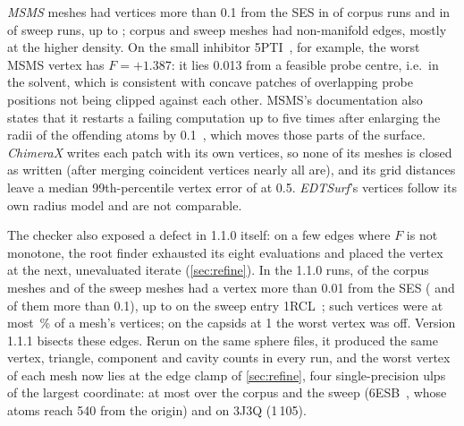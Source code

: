 \emph{MSMS} meshes had vertices more than 0.1\Ang{} from the SES in
 of  corpus runs and in
 of  sweep runs, up to
\Ang;  corpus and
 sweep meshes had non-manifold edges, mostly at the
higher density. On the small inhibitor 5PTI~\cite{pdb5pti}, for example, the worst MSMS
vertex has $F = +1.387$\Ang: it lies 0.013\Ang{} from a feasible probe
centre, i.e.\ in the solvent, which is consistent with concave patches of
overlapping probe positions not being clipped against each other. MSMS's
documentation also states that it restarts a failing computation up to five
times after enlarging the radii of the offending atoms by
0.1\Ang~\cite{msmsmanual}, which moves those parts of the surface.
\emph{ChimeraX} writes each patch with its own vertices, so none of its
meshes is closed as written (after merging coincident vertices nearly all
are), and its grid distances leave a median 99th-percentile vertex error of
\Ang{} at 0.5\Ang. \emph{EDTSurf}'s vertices follow its
own radius model and are not comparable.

The checker also exposed a defect in \sesmesh{} 1.1.0 itself: on a few edges
where $F$ is not monotone, the root finder exhausted its eight evaluations
and placed the vertex at the next, unevaluated iterate
(\cref{sec:refine}). In the 1.1.0 runs,  of
the  corpus meshes and
 of the 
sweep meshes had a vertex more than 0.01\Ang{} from the SES
( and  of them
more than 0.1\Ang), up to \Ang{} on the sweep
entry 1RCL~\cite{pdb1rcl}; such vertices were at most \,\% of a
mesh's vertices; on the capsids at 1\Ang{} the worst vertex was
\Ang{} off. Version 1.1.1 bisects these edges.
Rerun on the same sphere files, it produced the same vertex, triangle,
component and cavity counts in every run, and the worst vertex of each mesh
now lies at the edge clamp of \cref{sec:refine}, four single-precision ulps
of the largest coordinate: at most \Ang{} over the
corpus and the sweep (6ESB~\cite{pdb6esb}, whose atoms reach 540\Ang{} from the origin)
and \Ang{} on 3J3Q (1\,105\Ang).


